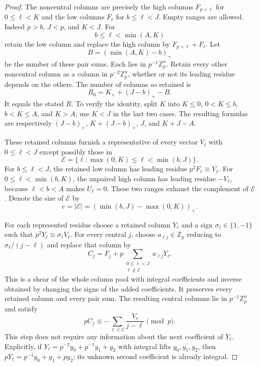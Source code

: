 \begin{proof}
The noncentral columns are precisely the high columns
$F_{p+\ell}$ for $0\le\ell<K$ and the low columns $F_\ell$ for
$b\le\ell<J$.  Empty ranges are allowed.  Indeed $p>b$, $J<p$,
and $K<J$.  For
\[
 b\le\ell<\min(A,K)
\]
retain the low column and replace the high column by
$F_{p+\ell}+F_\ell$.  Let
\[
 B=(\min(A,K)-b)_+
\]
be the number of these pair sums.  Each lies in $p^{-1}\mathbb Z_p^n$.
Retain every other noncentral column as a column in
$p^{-2}\mathbb Z_p^n$, whether or not its leading residue depends on
the others.  The number of columns so retained is
\begin{equation}\label{eq:odd-retained-count}
 R_0=K_++(J-b)_+-B.
\end{equation}
It equals the stated $R$.  To verify the identity, split $K$ into
$K\le0$, $0<K\le b$, $b<K\le A$, and $K>A$; use $K<J$ in the
last two cases.  The resulting formulas are respectively
$(J-b)_+$, $K+(J-b)_+$, $J$, and $K+J-A$.

These retained columns furnish a representative of every vector
$V_\ell$ with $0\le\ell<J$ except possibly those in
\[
 \mathcal E=\{\ell:\max(0,K)\le\ell<\min(b,J)\}.
\]
For $b\le\ell<J$, the retained low column has leading residue
$p^2F_\ell\equiv V_\ell$.  For $0\le\ell<\min(b,K)$, the
unpaired high column has leading residue $-V_\ell$, because
$\ell<b<A$ makes $U_\ell=0$.  These two ranges exhaust the complement
of $\mathcal E$.  Denote the size of $\mathcal E$ by
\[
 e=|\mathcal E|=(\min(b,J)-\max(0,K))_+.
\]

For each represented residue choose a retained column $Y_\ell$ and
a sign $\sigma_\ell\in\{1,-1\}$ such that
$p^2Y_\ell\equiv\sigma_\ell V_\ell$.  For every central $j$, choose
$a_{\ell j}\in\mathbb Z_p$ reducing to
$\sigma_\ell/(j-\ell)$ and replace that column by
\[
 C_j=F_j+p\sum_{\substack{0\le\ell<J\\\ell\notin\mathcal E}}
                                      a_{\ell j}Y_\ell.
\]
This is a shear of the whole column pool with integral coefficients
and inverse obtained by changing the signs of the added coefficients.
It preserves every retained column and every pair sum.  The resulting
central columns lie in $p^{-1}\mathbb Z_p^n$ and satisfy
\[
 pC_j\equiv-\sum_{\ell\in\mathcal E}\frac{V_\ell}{j-\ell}
       \pmod p.
\]
This step does not require any information about the next coefficient
of $Y_\ell$.  Explicitly, if
$Y_\ell=p^{-2}y_0+p^{-1}y_1+y_2$ with integral lifts $y_0,y_1,y_2$,
then $pY_\ell=p^{-1}y_0+y_1+py_2$; its unknown second coefficient is
already integral.


\end{proof}
